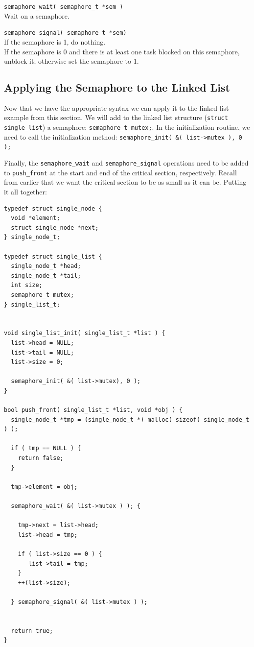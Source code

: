 \texttt{semaphore\_wait( semaphore\_t *sem )}\\
Wait on a semaphore.

\texttt{semaphore\_signal( semaphore\_t *sem)}\\
If the semaphore is 1, do nothing.\\
If the semaphore is 0 and there is at least one task blocked on this semaphore, unblock it; otherwise set the semaphore to 1.

\subsection*{Applying the Semaphore to the Linked List}

Now that we have the appropriate syntax we can apply it to the linked list example from this section. We will add to the linked list structure (\texttt{struct single\_list}) a semaphore: \texttt{semaphore\_t mutex;}. In the initialization routine, we need to call the initialization method: \texttt{semaphore\_init( \&( list->mutex ), 0 );}

Finally, the \texttt{semaphore\_wait} and \texttt{semaphore\_signal} operations need to be added to \texttt{push\_front} at the start and end of the critical section, respectively. Recall from earlier that we want the critical section to be as small as it can be. Putting it all together:

\begin{verbatim}
typedef struct single_node {
  void *element;
  struct single_node *next;
} single_node_t;

typedef struct single_list {
  single_node_t *head;
  single_node_t *tail;
  int size;
  semaphore_t mutex;
} single_list_t;


void single_list_init( single_list_t *list ) {
  list->head = NULL;
  list->tail = NULL;
  list->size = 0;

  semaphore_init( &( list->mutex), 0 );
}

bool push_front( single_list_t *list, void *obj ) {
  single_node_t *tmp = (single_node_t *) malloc( sizeof( single_node_t ) );
  
  if ( tmp == NULL ) {
    return false;
  }
  
  tmp->element = obj;
  
  semaphore_wait( &( list->mutex ) ); {
  
    tmp->next = list->head;
    list->head = tmp;

    if ( list->size == 0 ) {
       list->tail = tmp;
    }
    ++(list->size);
  
  } semaphore_signal( &( list->mutex ) );
  
  
  return true;
}
\end{verbatim}

